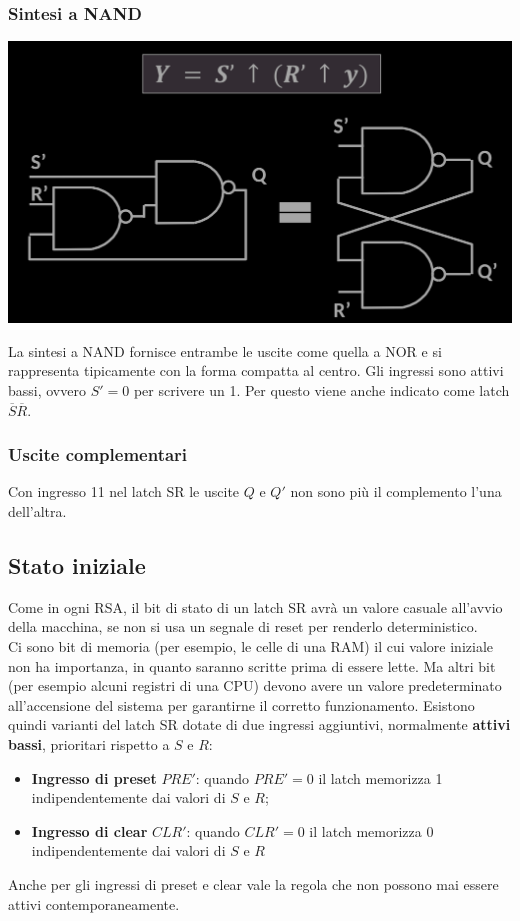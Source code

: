 \documentclass{article}
\begin{document}
\subsubsection*{Sintesi a NAND}
\begin{center}
    \includegraphics[scale=0.3]{latchSR-NAND.png}
\end{center}
La sintesi a NAND fornisce entrambe le uscite come quella a NOR e si rappresenta tipicamente con la forma compatta al centro. Gli ingressi sono attivi bassi, ovvero $S'=0$ per scrivere un 1. Per questo viene anche indicato come latch $\overline{S}\overline{R}$.
\subsubsection*{Uscite complementari}
Con ingresso 11 nel latch SR le uscite $Q$ e $Q'$ non sono più il complemento l'una dell'altra.
\subsection{Stato iniziale}
Come in ogni RSA, il bit di stato di un latch SR avrà un valore casuale all’avvio della macchina, se non si usa un segnale di reset per renderlo deterministico.\\
Ci sono bit di memoria (per esempio, le celle di una RAM) il cui valore iniziale non ha importanza, in quanto saranno scritte prima di essere lette. Ma altri bit (per esempio alcuni registri di una CPU) devono avere un valore predeterminato all’accensione del sistema per garantirne il corretto funzionamento.
Esistono quindi varianti del latch SR dotate di due ingressi aggiuntivi, normalmente \textbf{\color{blue} attivi bassi}, prioritari rispetto a $S$ e $R$:
\begin{itemize}
    \item \textbf{Ingresso di preset} $PRE'$: quando $PRE'=0$ il latch memorizza 1 indipendentemente dai valori di $S$ e $R$;
    \item \textbf{Ingresso di clear} $CLR'$: quando $CLR'=0$ il latch memorizza 0 indipendentemente dai valori di $S$ e $R$
\end{itemize}
Anche per gli ingressi di preset e clear vale la regola che non possono mai essere attivi contemporaneamente.
\end{document}
